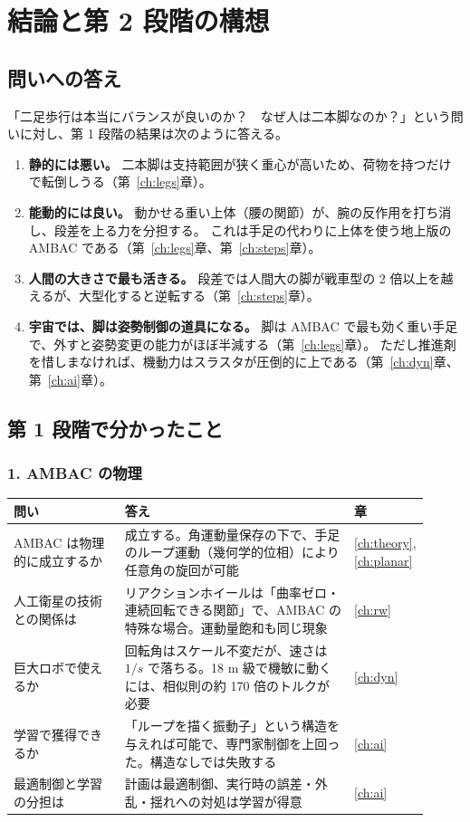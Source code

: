 \chapter{結論と第 2 段階の構想}\label{ch:conclusion}

\section{問いへの答え}

「二足歩行は本当にバランスが良いのか？　なぜ人は二本脚なのか？」という問いに対し、第 1 段階の結果は次のように答える。

\begin{enumerate}
\item \textbf{静的には悪い。} 二本脚は支持範囲が狭く重心が高いため、荷物を持つだけで転倒しうる（第~\ref{ch:legs}章）。
\item \textbf{能動的には良い。} 動かせる重い上体（腰の関節）が、腕の反作用を打ち消し、段差を上る力を分担する。
  これは手足の代わりに上体を使う地上版の AMBAC である（第~\ref{ch:legs}章、第~\ref{ch:steps}章）。
\item \textbf{人間の大きさで最も活きる。} 段差では人間大の脚が戦車型の 2 倍以上を越えるが、大型化すると逆転する（第~\ref{ch:steps}章）。
\item \textbf{宇宙では、脚は姿勢制御の道具になる。} 脚は AMBAC で最も効く重い手足で、外すと姿勢変更の能力がほぼ半減する（第~\ref{ch:legs}章）。
  ただし推進剤を惜しまなければ、機動力はスラスタが圧倒的に上である（第~\ref{ch:dyn}章、第~\ref{ch:ai}章）。
\end{enumerate}

\section{第 1 段階で分かったこと}

\subsection{1. AMBAC の物理}

\begin{longtable}{p{0.27\linewidth}p{0.56\linewidth}p{0.08\linewidth}}
\toprule
問い & 答え & 章 \\ \midrule \endhead
AMBAC は物理的に成立するか & 成立する。角運動量保存の下で、手足のループ運動（幾何学的位相）により任意角の旋回が可能 & \ref{ch:theory}, \ref{ch:planar} \\
人工衛星の技術との関係は & リアクションホイールは「曲率ゼロ・連続回転できる関節」で、AMBAC の特殊な場合。運動量飽和も同じ現象 & \ref{ch:rw} \\
巨大ロボで使えるか & 回転角はスケール不変だが、速さは $1/s$ で落ちる。18 m 級で機敏に動くには、相似則の約 170 倍のトルクが必要 & \ref{ch:dyn} \\
学習で獲得できるか & 「ループを描く振動子」という構造を与えれば可能で、専門家制御を上回った。構造なしでは失敗する & \ref{ch:ai} \\
最適制御と学習の分担は & 計画は最適制御、実行時の誤差・外乱・揺れへの対処は学習が得意 & \ref{ch:ai} \\
\bottomrule
\end{longtable}

